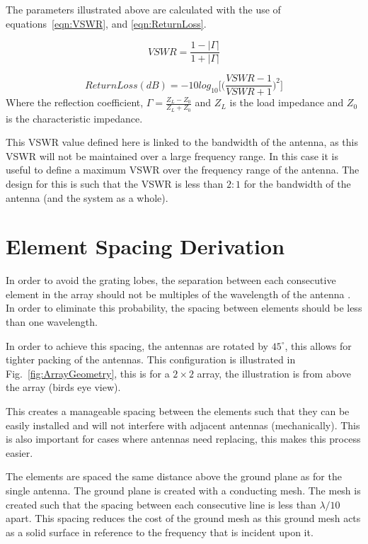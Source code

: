 \documentclass[11pt]{witseiepaper}
\begin{document}
\begin{bibunit}[witseie]
The parameters illustrated above are calculated with the use of equations~\ref{eqn:VSWR}, and \ref{eqn:ReturnLoss}.


\begin{equation} \label{eqn:VSWR}
VSWR = \frac{1 - |\Gamma|}{1 + |\Gamma|}
\end{equation}

\begin{equation} \label{eqn:ReturnLoss}
Return Loss (dB) = -10 log_{10} \Bigg[ \Big(\frac{VSWR - 1}{VSWR + 1} \Big)^2 \Bigg]
\end{equation}
Where the reflection coefficient, $\Gamma = \frac{Z_L - Z_0}{Z_L + Z_0}$ and $Z_L$ is the load impedance and $Z_0$ is the characteristic impedance.

This VSWR value defined here is linked to the bandwidth of the antenna, as this VSWR will not be maintained over a large frequency range. In this case it is useful to define a maximum VSWR over the frequency range of the antenna. The design for this is such that the VSWR is less than $2:1$ for the bandwidth of the antenna (and the system as a whole).



\section{Element Spacing Derivation} \label{sec:ElementSpacingDerivation}
In order to avoid the grating lobes, the separation between each consecutive element in the array should not be multiples of the wavelength of the antenna \cite[p.~297]{Balanis}.
In order to eliminate this probability, the spacing between elements should be less than one wavelength.

In order to achieve this spacing, the antennas are rotated by $45^{\circ}$, this allows for tighter packing of the antennas. This configuration is illustrated in Fig.~\ref{fig:ArrayGeometry}, this is for a $2 \times 2$ array, the illustration is from above the array (birds eye view).

This creates a manageable spacing between the elements such that they can be easily installed and will not interfere with adjacent antennas (mechanically). This is also important for cases where antennas need replacing, this makes this process easier.

The elements are spaced the same distance above the ground plane as for the single antenna. The ground plane is created with a conducting mesh. The mesh is created such that the spacing between each consecutive line is less than $\lambda/10$ apart. This spacing reduces the cost of the ground mesh as this ground mesh acts as a solid surface in reference to the frequency that is incident upon it.


\end{bibunit}
\end{document}
